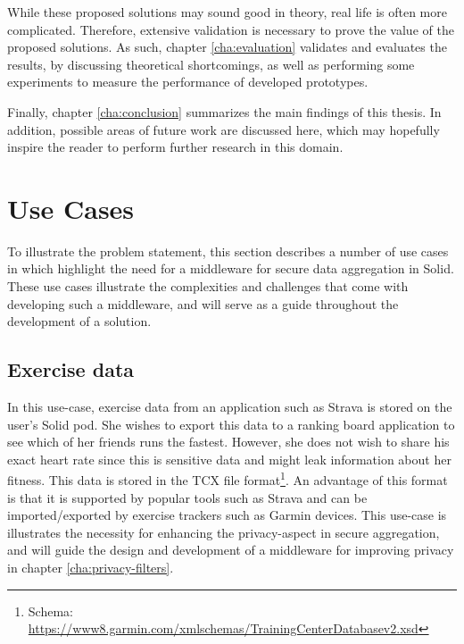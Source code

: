 While these proposed solutions may sound good in theory, real life is often more complicated. Therefore, extensive validation is necessary to prove the value of the proposed solutions. As such, chapter \ref{cha:evaluation} validates and evaluates the results, by discussing theoretical shortcomings, as well as performing some experiments to measure the performance of developed prototypes. 

Finally, chapter \ref{cha:conclusion} summarizes the main findings of this thesis. In addition, possible areas of future work are discussed here, which may hopefully inspire the reader to perform further research in this domain.

\section{Use Cases}
\label{sec:usecases}
To illustrate the problem statement, this section describes a number of use cases in which highlight the need for a middleware for secure data aggregation in Solid. These use cases illustrate the complexities and challenges that come with developing such a middleware, and will serve as a guide throughout the development of a solution.

\subsection{Exercise data}
\label{usecase:ex-data}
In this use-case, exercise data from an application such as Strava is stored on the user's Solid pod. She wishes to export this data to a ranking board application to see which of her friends runs the fastest. However, she does not wish to share his exact heart rate since this is sensitive data and might leak information about her fitness. This data is stored in the TCX file format\footnote{Schema: \url{https://www8.garmin.com/xmlschemas/TrainingCenterDatabasev2.xsd}}. An advantage of this format is that it is supported by popular tools such as Strava and can be imported/exported by exercise trackers such as Garmin devices. This use-case is illustrates the necessity for enhancing the privacy-aspect in secure aggregation, and will guide the design and development of a middleware for improving privacy in chapter \ref{cha:privacy-filters}. 

